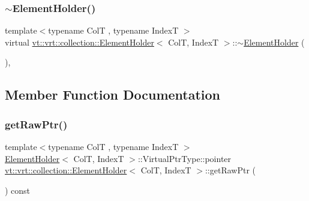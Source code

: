 \mbox{\label{structvt_1_1vrt_1_1collection_1_1_element_holder_ab74327ed9bdbe171d7feab3a1efb8d63}} 
\subsubsection{\texorpdfstring{$\sim$\+Element\+Holder()}{~ElementHolder()}}
{\footnotesize\ttfamily template$<$typename ColT , typename IndexT $>$ \\
virtual \hyperlink{structvt_1_1vrt_1_1collection_1_1_element_holder}{vt\+::vrt\+::collection\+::\+Element\+Holder}$<$ ColT, IndexT $>$\+::$\sim$\hyperlink{structvt_1_1vrt_1_1collection_1_1_element_holder}{Element\+Holder} (\begin{DoxyParamCaption}{ }\end{DoxyParamCaption})\hspace{0.3cm}{\ttfamily [virtual]}, {\ttfamily [default]}}



\subsection{Member Function Documentation}
\mbox{\label{structvt_1_1vrt_1_1collection_1_1_element_holder_a3db2beb1053f1da4abe1944e0aa33129}} 
\subsubsection{\texorpdfstring{get\+Raw\+Ptr()}{getRawPtr()}}
{\footnotesize\ttfamily template$<$typename ColT , typename IndexT $>$ \\
\hyperlink{structvt_1_1vrt_1_1collection_1_1_element_holder}{Element\+Holder}$<$ ColT, IndexT $>$\+::Virtual\+Ptr\+Type\+::pointer \hyperlink{structvt_1_1vrt_1_1collection_1_1_element_holder}{vt\+::vrt\+::collection\+::\+Element\+Holder}$<$ ColT, IndexT $>$\+::get\+Raw\+Ptr (\begin{DoxyParamCaption}{ }\end{DoxyParamCaption}) const}



